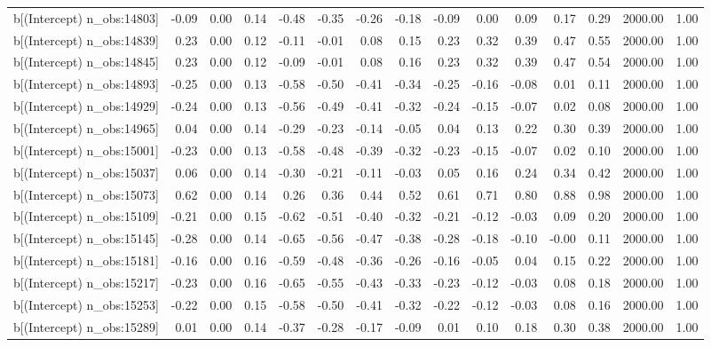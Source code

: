 \begin{table}[ht]
\begin{tabular}{rrrrrrrrrrrrrrr}
  b[(Intercept) n\_obs:14803] & -0.09 & 0.00 & 0.14 & -0.48 & -0.35 & -0.26 & -0.18 & -0.09 & 0.00 & 0.09 & 0.17 & 0.29 & 2000.00 & 1.00 \\ 
  b[(Intercept) n\_obs:14839] & 0.23 & 0.00 & 0.12 & -0.11 & -0.01 & 0.08 & 0.15 & 0.23 & 0.32 & 0.39 & 0.47 & 0.55 & 2000.00 & 1.00 \\ 
  b[(Intercept) n\_obs:14845] & 0.23 & 0.00 & 0.12 & -0.09 & -0.01 & 0.08 & 0.16 & 0.23 & 0.32 & 0.39 & 0.47 & 0.54 & 2000.00 & 1.00 \\ 
  b[(Intercept) n\_obs:14893] & -0.25 & 0.00 & 0.13 & -0.58 & -0.50 & -0.41 & -0.34 & -0.25 & -0.16 & -0.08 & 0.01 & 0.11 & 2000.00 & 1.00 \\ 
  b[(Intercept) n\_obs:14929] & -0.24 & 0.00 & 0.13 & -0.56 & -0.49 & -0.41 & -0.32 & -0.24 & -0.15 & -0.07 & 0.02 & 0.08 & 2000.00 & 1.00 \\ 
  b[(Intercept) n\_obs:14965] & 0.04 & 0.00 & 0.14 & -0.29 & -0.23 & -0.14 & -0.05 & 0.04 & 0.13 & 0.22 & 0.30 & 0.39 & 2000.00 & 1.00 \\ 
  b[(Intercept) n\_obs:15001] & -0.23 & 0.00 & 0.13 & -0.58 & -0.48 & -0.39 & -0.32 & -0.23 & -0.15 & -0.07 & 0.02 & 0.10 & 2000.00 & 1.00 \\ 
  b[(Intercept) n\_obs:15037] & 0.06 & 0.00 & 0.14 & -0.30 & -0.21 & -0.11 & -0.03 & 0.05 & 0.16 & 0.24 & 0.34 & 0.42 & 2000.00 & 1.00 \\ 
  b[(Intercept) n\_obs:15073] & 0.62 & 0.00 & 0.14 & 0.26 & 0.36 & 0.44 & 0.52 & 0.61 & 0.71 & 0.80 & 0.88 & 0.98 & 2000.00 & 1.00 \\ 
  b[(Intercept) n\_obs:15109] & -0.21 & 0.00 & 0.15 & -0.62 & -0.51 & -0.40 & -0.32 & -0.21 & -0.12 & -0.03 & 0.09 & 0.20 & 2000.00 & 1.00 \\ 
  b[(Intercept) n\_obs:15145] & -0.28 & 0.00 & 0.14 & -0.65 & -0.56 & -0.47 & -0.38 & -0.28 & -0.18 & -0.10 & -0.00 & 0.11 & 2000.00 & 1.00 \\ 
  b[(Intercept) n\_obs:15181] & -0.16 & 0.00 & 0.16 & -0.59 & -0.48 & -0.36 & -0.26 & -0.16 & -0.05 & 0.04 & 0.15 & 0.22 & 2000.00 & 1.00 \\ 
  b[(Intercept) n\_obs:15217] & -0.23 & 0.00 & 0.16 & -0.65 & -0.55 & -0.43 & -0.33 & -0.23 & -0.12 & -0.03 & 0.08 & 0.18 & 2000.00 & 1.00 \\ 
  b[(Intercept) n\_obs:15253] & -0.22 & 0.00 & 0.15 & -0.58 & -0.50 & -0.41 & -0.32 & -0.22 & -0.12 & -0.03 & 0.08 & 0.16 & 2000.00 & 1.00 \\ 
  b[(Intercept) n\_obs:15289] & 0.01 & 0.00 & 0.14 & -0.37 & -0.28 & -0.17 & -0.09 & 0.01 & 0.10 & 0.18 & 0.30 & 0.38 & 2000.00 & 1.00 \\ 

\end{tabular}
\end{table}
